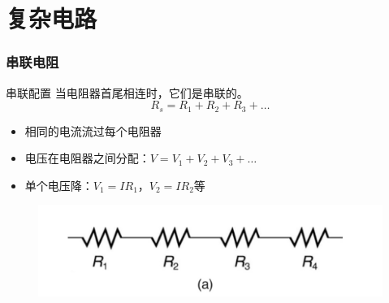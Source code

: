 \documentclass{beamer}
\begin{document}
\section{复杂电路}
\begin{frame}
    \frametitle{串联电阻}
    \begin{block}{串联配置}
        当电阻器首尾相连时，它们是串联的。
        \[ R_s = R_1 + R_2 + R_3 + \ldots \]
    \end{block}
    \begin{itemize}
        \item 相同的电流流过每个电阻器
        \item 电压在电阻器之间分配：$V = V_1 + V_2 + V_3 + \ldots$
        \item 单个电压降：$V_1 = IR_1$，$V_2 = IR_2$等
    \end{itemize}
    \begin{center}
        \begin{figure}
            \centering
            \includegraphics[width=0.75\linewidth]{phys12-circuits-resistors-in-series.png}
        \end{figure}
    \end{center}
\end{frame}
\end{document}
